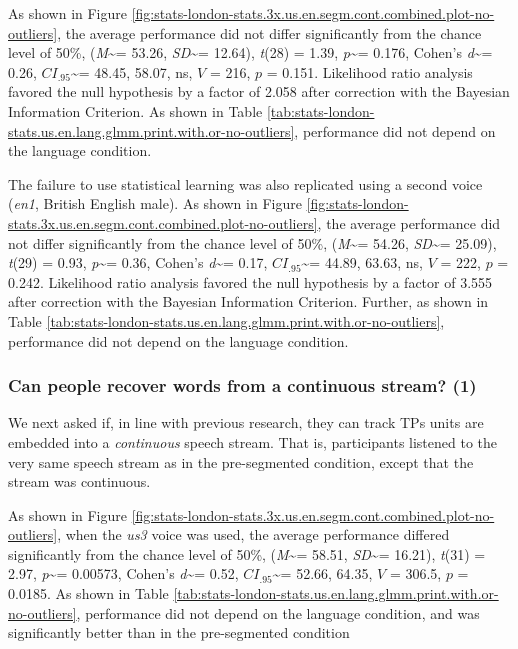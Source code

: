 \documentclass[
]{article}
\newcommand{\T}{{\em t\/}}
\newcommand{\p}{{\em p\/}}
\newcommand{\M}{{\em M\/}}
\newcommand{\SD}{{\em SD\/}}
\newcommand{\D}{Cohen's {\em d\/}}
\newcommand{\CI}{$CI_{.95}$}
\begin{document}
As shown in Figure
\ref{fig:stats-london-stats.3x.us.en.segm.cont.combined.plot-no-outliers},
the average performance did not differ significantly from the chance
level of 50\%, (\M\textasciitilde= 53.26, \SD\textasciitilde= 12.64),
\T(28) = 1.39, \p\textasciitilde= 0.176, \D\textasciitilde= 0.26,
\CI\textasciitilde= 48.45, 58.07, ns, \(V\) = 216, \(p\) = 0.151.
Likelihood ratio analysis favored the null hypothesis by a factor of
2.058 after correction with the Bayesian Information Criterion. As shown
in Table
\ref{tab:stats-london-stats.us.en.lang.glmm.print.with.or-no-outliers},
performance did not depend on the language condition.

The failure to use statistical learning was also replicated using a
second voice (\emph{en1}, British English male). As shown in Figure
\ref{fig:stats-london-stats.3x.us.en.segm.cont.combined.plot-no-outliers},
the average performance did not differ significantly from the chance
level of 50\%, (\M\textasciitilde= 54.26, \SD\textasciitilde= 25.09),
\T(29) = 0.93, \p\textasciitilde= 0.36, \D\textasciitilde= 0.17,
\CI\textasciitilde= 44.89, 63.63, ns, \(V\) = 222, \(p\) = 0.242.
Likelihood ratio analysis favored the null hypothesis by a factor of
3.555 after correction with the Bayesian Information Criterion. Further,
as shown in Table
\ref{tab:stats-london-stats.us.en.lang.glmm.print.with.or-no-outliers},
performance did not depend on the language condition.

\hypertarget{can-people-recover-words-from-a-continuous-stream-1-1}{%
\subsubsection{Can people recover words from a continuous stream?
(1)}\label{can-people-recover-words-from-a-continuous-stream-1-1}}

We next asked if, in line with previous research, they can track TPs
units are embedded into a \emph{continuous} speech stream. That is,
participants listened to the very same speech stream as in the
pre-segmented condition, except that the stream was continuous.

As shown in Figure
\ref{fig:stats-london-stats.3x.us.en.segm.cont.combined.plot-no-outliers},
when the \emph{us3} voice was used, the average performance differed
significantly from the chance level of 50\%, (\M\textasciitilde= 58.51,
\SD\textasciitilde= 16.21), \T(31) = 2.97, \p\textasciitilde= 0.00573,
\D\textasciitilde= 0.52, \CI\textasciitilde= 52.66, 64.35, \(V\) =
306.5, \(p\) = 0.0185. As shown in Table
\ref{tab:stats-london-stats.us.en.lang.glmm.print.with.or-no-outliers},
performance did not depend on the language condition, and was
significantly better than in the pre-segmented condition
\end{document}

